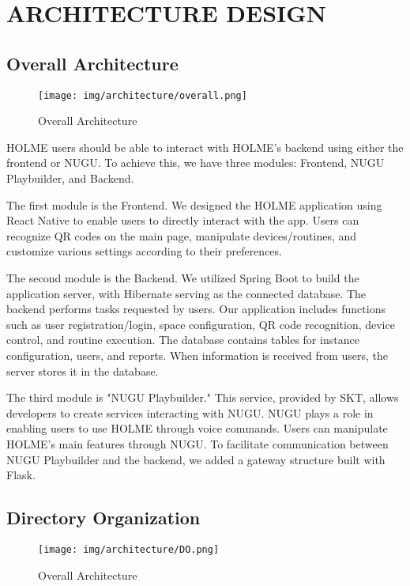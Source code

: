 \documentclass[conference]{IEEEtran}
\begin{document}
\section{ARCHITECTURE DESIGN}
\subsection{Overall Architecture}

\begin{figure}[h]
\centering   
\texttt{[image: img/architecture/overall.png]}
\caption{Overall Architecture}
\end{figure}
\vspace{1cm}
HOLME users should be able to interact with HOLME's backend using either the frontend or NUGU. To achieve this, we have three modules: Frontend, NUGU Playbuilder, and Backend.

The first module is the Frontend. We designed the HOLME application using React Native to enable users to directly interact with the app. Users can recognize QR codes on the main page, manipulate devices/routines, and customize various settings according to their preferences.

The second module is the Backend. We utilized Spring Boot to build the application server, with Hibernate serving as the connected database. The backend performs tasks requested by users. Our application includes functions such as user registration/login, space configuration, QR code recognition, device control, and routine execution. The database contains tables for instance configuration, users, and reports. When information is received from users, the server stores it in the database.

The third module is "NUGU Playbuilder." This service, provided by SKT, allows developers to create services interacting with NUGU. NUGU plays a role in enabling users to use HOLME through voice commands. Users can manipulate HOLME's main features through NUGU. To facilitate communication between NUGU Playbuilder and the backend, we added a gateway structure built with Flask.\\

\subsection{Directory Organization}
\begin{figure}[h]
\centering   
\texttt{[image: img/architecture/DO.png]}
\caption{Overall Architecture}
\end{figure}
\end{document}
